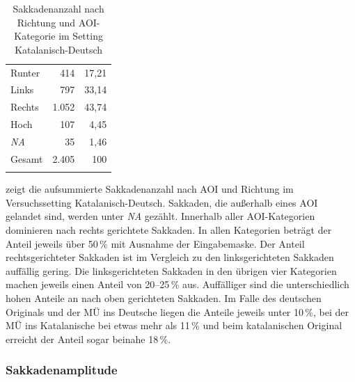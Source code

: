 \begin{table}
\begin{minipage}{0.5\textwidth}
\begin{tabular}{lrr}
            \midrule
            Runter & 414 & 17,21 \\ 
            Links & 797 & 33,14 \\ 
            Rechts & 1.052 & 43,74 \\ 
            Hoch & 107 & 4,45 \\ 
            \emph{NA} & 35 & 1,46 \\ 
            \midrule
            {Gesamt} & 2.405 & 100 \\ 
            \lspbottomrule
         \end{tabular}    
    \end{minipage}
     \caption{Sakkadenanzahl nach Richtung und AOI-Kategorie im Setting Katalanisch-Deutsch}
    \label{K6:tab:saccount-direction-CatDe}
\end{table}



\begin{sloppypar}
 zeigt die aufsummierte Sakkadenanzahl nach AOI und Richtung im Versuchssetting Katalanisch-Deutsch. Sakkaden, die außerhalb eines AOI gelandet sind, werden unter \emph{NA} gezählt. Innerhalb aller AOI-Kategorien dominieren nach rechts gerichtete Sakkaden. In allen Kategorien beträgt der Anteil jeweils über 50\,\% mit Ausnahme der Eingabemaske. Der Anteil rechtsgerichteter Sakkaden ist im Vergleich zu den linksgerichteten Sakkaden auffällig gering. Die linksgerichteten Sakkaden in den übrigen vier Kategorien machen jeweils einen Anteil von 20--25\,\% aus. Auffälliger sind die unterschiedlich hohen Anteile an nach oben gerichteten Sakkaden. Im Falle des deutschen Originals und der MÜ ins Deutsche liegen die Anteile jeweils unter 10\,\%, bei der MÜ ins Katalanische bei etwas mehr als 11\,\% und beim katalanischen Original erreicht der Anteil sogar beinahe 18\,\%. 
\end{sloppypar}



\subsubsection{Sakkadenamplitude}
\label{K6:subsubsec:sacamp:catde}


